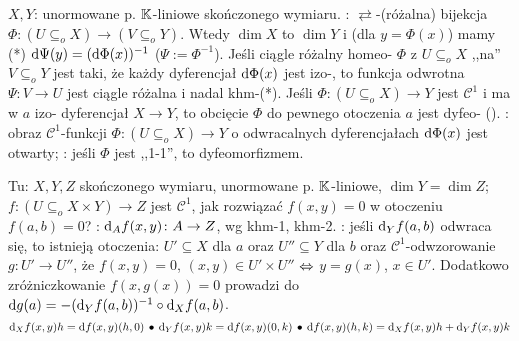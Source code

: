 $X, Y$:  unormowane p. $\mathbb{K}$-liniowe skończonego wymiaru.
: $\rightleftarrows$-(różalna) bijekcja $\Phi \colon (U \subseteq_o X) \to (V \subseteq_o Y)$.
Wtedy $\dim X$ to $\dim Y$ i (dla $y = \Phi(x)$) mamy (*) $\textrm{d}\Psi(y) = (\textrm{d}\Phi(x))^{-1}$ ($\Psi := \Phi^{-1}$).
Jeśli ciągle różalny homeo- $\Phi$ z $U \subseteq_o X$ ,,na'' $V \subseteq_o Y$ jest taki, że każdy dyferencjał $\textrm{d} \Phi(x)$ jest izo-, to funkcja odwrotna $\Psi \colon V \to U$ jest ciągle różalna i nadal khm-(*).
Jeśli $\Phi \colon (U \subseteq_o X) \to Y$ jest $\mathscr C^1$ i ma w $a$ izo- dyferencjał $X \to Y$, to obcięcie $\Phi$ do pewnego otoczenia $a$ jest dyfeo- ().
: obraz $\mathscr C^1$-funkcji $\Phi \colon (U \subseteq_o X) \to Y$ o odwracalnych dyferencjałach $\textrm{d}\Phi(x)$ jest otwarty; : jeśli $\Phi$ jest ,,1-1'', to dyfeomorfizmem.

Tu:  $X, Y, Z$ skończonego wymiaru, unormowane p. $\mathbb{K}$-liniowe, $\dim Y = \dim Z$; $f \colon (U \subseteq_o X \times Y) \to Z$ jest $\mathscr C^1$, jak rozwiązać $f(x,y) = 0$ w otoczeniu $f(a,b)=0$?
: $\textrm{d}_{A}f(x,y) \colon A \to Z$, wg khm-1, khm-2.
: jeśli $\textrm{d}_Yf(a,b)$ odwraca się, to istnieją otoczenia: $U' \subseteq X$ dla $a$ oraz $U'' \subseteq Y$ dla $b$ oraz $\mathscr C^1$-odwzorowanie $g \colon U' \to U''$, że $f(x,y) = 0$, $(x,y) \in U' \times U''$ $\Leftrightarrow$ $y = g(x)$, $x \in U'$.
Dodatkowo zróżniczkowanie $f(x, g(x)) = 0$ prowadzi do $\textrm{d} g(a) = -(\textrm{d}{}_Yf(a,b))^{-1} \circ \textrm{d}{}_Xf(a,b)$.
\[
	\textrm{d}{}_Xf(x,y) h = \textrm{d} f(x,y)(h,0) \, \bullet \,
	\textrm{d}{}_Yf(x,y) k = \textrm{d} f(x,y)(0,k) \, \bullet \,
	\textrm{d} f(x,y)(h,k) = \textrm{d}{}_Xf(x,y) h + \textrm{d}{}_Yf(x,y) k
\]

